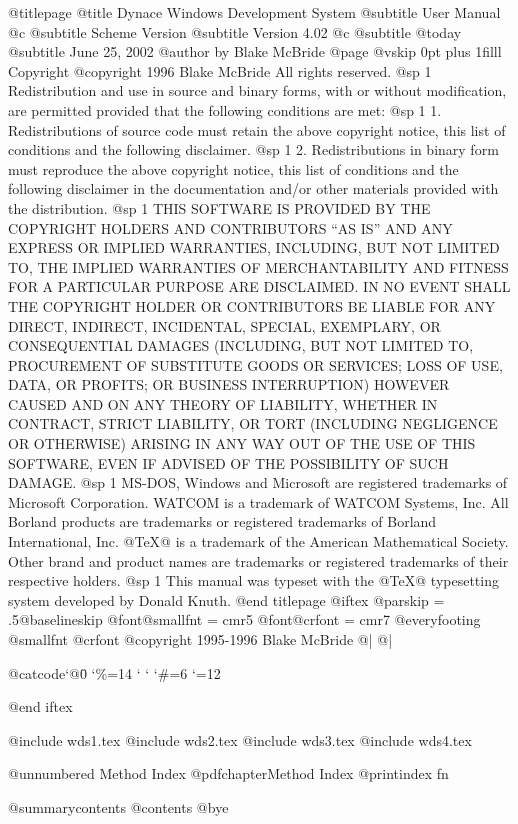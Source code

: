 @titlepage
@title Dynace Windows Development System
@subtitle User Manual
@c @subtitle Scheme Version
@subtitle Version 4.02
@c @subtitle @today{}
@subtitle June 25, 2002
@author by Blake McBride
@page
@vskip 0pt plus 1filll
Copyright  @copyright{} 1996 Blake McBride
All rights reserved.
@sp 1
Redistribution and use in source and binary forms, with or without
modification, are permitted provided that the following conditions are
met:
@sp 1
1. Redistributions of source code must retain the above copyright
notice, this list of conditions and the following disclaimer.
@sp 1
2. Redistributions in binary form must reproduce the above copyright
notice, this list of conditions and the following disclaimer in the
documentation and/or other materials provided with the distribution.
@sp 1
THIS SOFTWARE IS PROVIDED BY THE COPYRIGHT HOLDERS AND CONTRIBUTORS
``AS IS'' AND ANY EXPRESS OR IMPLIED WARRANTIES, INCLUDING, BUT NOT
LIMITED TO, THE IMPLIED WARRANTIES OF MERCHANTABILITY AND FITNESS FOR
A PARTICULAR PURPOSE ARE DISCLAIMED. IN NO EVENT SHALL THE COPYRIGHT
HOLDER OR CONTRIBUTORS BE LIABLE FOR ANY DIRECT, INDIRECT, INCIDENTAL,
SPECIAL, EXEMPLARY, OR CONSEQUENTIAL DAMAGES (INCLUDING, BUT NOT
LIMITED TO, PROCUREMENT OF SUBSTITUTE GOODS OR SERVICES; LOSS OF USE,
DATA, OR PROFITS; OR BUSINESS INTERRUPTION) HOWEVER CAUSED AND ON ANY
THEORY OF LIABILITY, WHETHER IN CONTRACT, STRICT LIABILITY, OR TORT
(INCLUDING NEGLIGENCE OR OTHERWISE) ARISING IN ANY WAY OUT OF THE USE
OF THIS SOFTWARE, EVEN IF ADVISED OF THE POSSIBILITY OF SUCH DAMAGE.
@sp 1
MS-DOS, Windows and Microsoft are registered trademarks of
Microsoft Corporation.  WATCOM is a trademark of WATCOM Systems,
Inc. All Borland products are trademarks or registered trademarks of
Borland International, Inc. @TeX@ is a trademark of the American
Mathematical Society. Other brand and product names are trademarks or
registered trademarks of their respective holders.
@sp 1
This manual was typeset with the @TeX@ typesetting system developed by
Donald Knuth.
@end titlepage
@iftex
@parskip = .5@baselineskip
@font@smallfnt = cmr5
@font@crfont = cmr7
@everyfooting {@smallfnt {@crfont @copyright{}} 1995-1996 Blake McBride} @| @|

{@catcode`@\=0 \catcode`\%=14 \catcode` \catcode` \catcode `\#=6 \catcode `\@=12

}

@end iftex



@include wds1.tex
@include wds2.tex
@include wds3.tex
@include wds4.tex


@unnumbered Method Index
@pdfchapter{Method Index}
@printindex fn

@summarycontents
@contents
@bye

